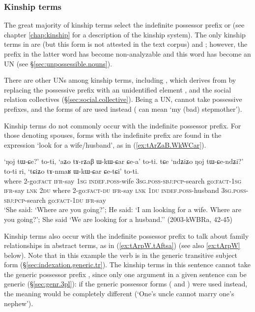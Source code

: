 \subsubsection{Kinship terms} \label{sec:kinship}
The great majority of kinship terms select the indefinite possessor prefix  or  (see chapter \ref{chap:kinship} for a description of the kinship system). The only kinship terms in  are  (but this form is not attested in the text corpus) and ; however, the  prefix in the latter word has become non-analyzable and this word has become an UN (see §\ref{sec:unpossessible.nouns}). 

There are other UNs among kinship terms, including , which derives from  by replacing the possessive prefix with an unidentified element , and the social relation collectives (§\ref{sec:social.collective}). Being a UN,  cannot take possessive prefixes, and the forms of  are used instead ( can mean `my (bad) stepmother').

Kinship terms do not commonly occur with the indefinite possessor prefix. For those denoting spouses, forms with the indefinite prefix are found in the expression `look for a wife/husband', as in (\ref{ex:tArZaB.WkWCar}).
 
\begin{exe}
\ex \label{ex:tArZaB.WkWCar}
 \gll `ŋoj tɯ-ɕe?' to-ti, `aʑo tɤ-rʑaβ ɯ-kɯ-ɕar ɕe-a' to-ti. tɕe `ndʑiʑo ŋoj tɯ-ɕe-ndʑi?' to-ti ri, `tɕiʑo tɤ-nmaʁ ɯ-kɯ-ɕar ɕe-tɕi' to-ti. \\
 where 2-go:\textsc{fact} \textsc{ifr}-say \textsc{1sg} \textsc{indef}.\textsc{poss}-wife \textsc{3sg}.\textsc{poss}-\textsc{sbj}:\textsc{pcp}-search go:\textsc{fact}-\textsc{1sg} \textsc{ifr}-say \textsc{lnk} \textsc{2du} where 2-go:\textsc{fact}-\textsc{du} \textsc{ifr}-say \textsc{lnk} \textsc{1du} \textsc{indef}.\textsc{poss}-husband  \textsc{3sg}.\textsc{poss}-\textsc{sbj}:\textsc{pcp}-search go:\textsc{fact}-\textsc{1du} \textsc{ifr}-say  \\
 \glt `She said: `Where are you going?'; He said: `I am looking for a wife. Where are you going?'; She said `We are looking for a husband.'' (2003-kWBRa, 42-45)
\end{exe}

Kinship terms also occur with the indefinite possessor prefix to talk about family relationships in abstract terms, as in (\ref{ex:tArpW.tAftsa}) (see also \ref{ex:tArpW} below). Note that in this example the verb is in the generic transitive subject form (§\ref{sec:indexation.generic.tr}). The kinship terms in this sentence cannot take the generic possessor prefix , since only one argument in a given sentence can be generic (§\ref{sec:genr.3pl}): if the generic possessor forms ( and ) were used instead, the meaning would be completely different (`One's uncle cannot marry one's nephew').

